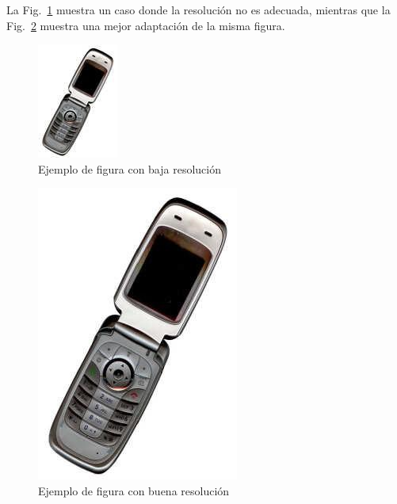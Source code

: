 ﻿\documentclass[10pt,twocolumn]{article}
\begin{document}
La Fig.~\ref{fig:low-res} muestra un caso donde la resolución no es adecuada, mientras que la Fig.~\ref{fig:good-res} muestra una mejor adaptación de la misma figura.

\begin{figure}[t]
  \centering
  \includegraphics[width=0.55\columnwidth]{../img/image1.jpg}
  \caption{Ejemplo de figura con baja resolución}
  \label{fig:low-res}
\end{figure}

\begin{figure}[t]
  \centering
  \includegraphics[width=0.53\columnwidth]{../img/image2.jpg}
  \caption{Ejemplo de figura con buena resolución}
  \label{fig:good-res}
\end{figure}
\end{document}
